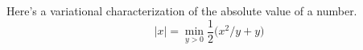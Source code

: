 \documentclass[preview]{standalone}
\begin{document}
Here's a variational characterization of the absolute value of a number.
\begin{equation*}
    |x| = \min_{y > 0} \frac{1}{2} \big(x^2/y + y)
\end{equation*}
\end{document}
